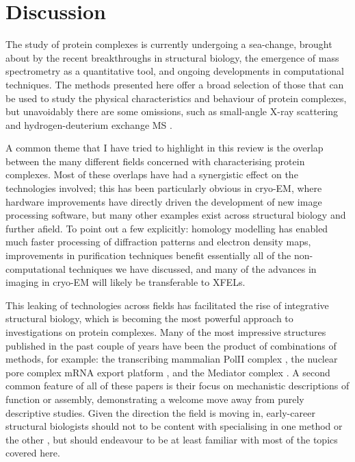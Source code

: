 \documentclass[a4paper,11pt,twoside,openright]{scrbook}
\begin{document}
\section{Discussion}
The study of protein complexes is currently undergoing a sea-change, brought
about by the recent breakthroughs in structural biology, the emergence of mass
spectrometry as a quantitative tool, and ongoing developments in computational
techniques. The methods presented here offer a broad selection of those that can
be used to study the physical characteristics and behaviour of protein
complexes, but unavoidably there are some omissions, such as small-angle X-ray
scattering \cite{Mertens2010} and hydrogen-deuterium exchange MS
\cite{Zhang2015b}.

A common theme that I have tried to highlight in this review is the overlap
between the many different fields concerned with characterising protein
complexes. Most of these overlaps have had a synergistic effect on the
technologies involved; this has been particularly obvious in cryo-EM, where
hardware improvements have directly driven the development of new image
processing software, but many other examples exist across structural biology and
further afield. To point out a few explicitly: homology modelling has enabled
much faster processing of diffraction patterns and electron density maps,
improvements in purification techniques benefit essentially all of the
non-computational techniques we have discussed, and many of the advances in
imaging in cryo-EM will likely be transferable to XFELs.

This leaking of technologies across fields has facilitated the rise of
integrative structural biology, which is becoming the most powerful approach to
investigations on protein complexes. Many of the most impressive structures
published in the past couple of years have been the product of combinations of
methods, for example: the transcribing mammalian PolII complex
\cite{Bernecky2016}, the nuclear pore complex mRNA export platform
\cite{Fernandez-Martinez2016}, and the Mediator complex \cite{Tsai2017}. A
second common feature of all of these papers is their focus on mechanistic
descriptions of function or assembly, demonstrating a welcome move away from
purely descriptive studies. Given the direction the field is moving in,
early-career structural biologists should not to be content with specialising in
one method or the other \cite{Shi2014,Cassiday2014}, but should endeavour to be
at least familiar with most of the topics covered here.
\end{document}
